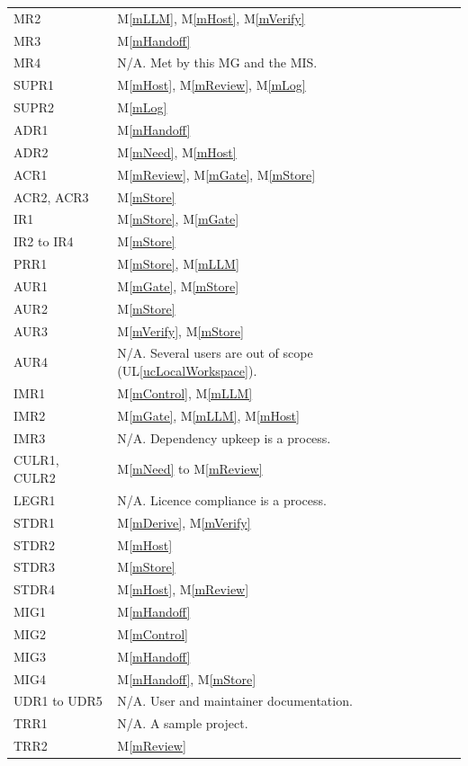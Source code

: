 \documentclass[12pt, titlepage]{article}
\newcommand{\uref}[1]{UL\ref{#1}}
\newcommand{\mref}[1]{M\ref{#1}}
\begin{document}
\begin{longtable}{p{} p{}}
MR2 & \mref{mLLM}, \mref{mHost}, \mref{mVerify}\\
MR3 & \mref{mHandoff}\\
MR4 & N/A. Met by this MG and the MIS.\\
SUPR1 & \mref{mHost}, \mref{mReview}, \mref{mLog}\\
SUPR2 & \mref{mLog}\\
ADR1 & \mref{mHandoff}\\
ADR2 & \mref{mNeed}, \mref{mHost}\\
ACR1 & \mref{mReview}, \mref{mGate}, \mref{mStore}\\
ACR2, ACR3 & \mref{mStore}\\
IR1 & \mref{mStore}, \mref{mGate}\\
IR2 to IR4 & \mref{mStore}\\
PRR1 & \mref{mStore}, \mref{mLLM}\\
AUR1 & \mref{mGate}, \mref{mStore}\\
AUR2 & \mref{mStore}\\
AUR3 & \mref{mVerify}, \mref{mStore}\\
AUR4 & N/A. Several users are out of scope (\uref{ucLocalWorkspace}).\\
IMR1 & \mref{mControl}, \mref{mLLM}\\
IMR2 & \mref{mGate}, \mref{mLLM}, \mref{mHost}\\
IMR3 & N/A. Dependency upkeep is a process.\\
CULR1, CULR2 & \mref{mNeed} to \mref{mReview}\\
LEGR1 & N/A. Licence compliance is a process.\\
STDR1 & \mref{mDerive}, \mref{mVerify}\\
STDR2 & \mref{mHost}\\
STDR3 & \mref{mStore}\\
STDR4 & \mref{mHost}, \mref{mReview}\\
MIG1 & \mref{mHandoff}\\
MIG2 & \mref{mControl}\\
MIG3 & \mref{mHandoff}\\
MIG4 & \mref{mHandoff}, \mref{mStore}\\
UDR1 to UDR5 & N/A. User and maintainer documentation.\\
TRR1 & N/A. A sample project.\\
TRR2 & \mref{mReview}\\
\bottomrule
\end{longtable}
\end{document}
